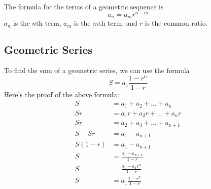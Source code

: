 \documentclass{article}
\begin{document}
\begin{multicols}{2}
        The formula for the terms of a geometric sequence is
        \[a_n = a_mr^{n - m}\] $a_n$ is the $n$th term, $a_m$ is the $m$th term,
        and $r$ is the common ratio.

        \subsection*{Geometric Series}
        To find the sum of a geometric series, we can use the formula
        \[S = a_1 \frac{1 - r^n}{1 - r}\] Here's the proof of the above formula:
        \begin{align*}
            S &= a_1 + a_2 + \dots + a_n \\
            Sr &= a_1 r + a_2 r + \dots + a_n r \\
            Sr &= a_2 + a_3 + \dots + a_{n + 1} \\
            S - Sr &= a_1 - a_{n + 1} \\
            S(1 - r) &= a_1 - a_{n + 1} \\
            S &= \frac{a_1 - a_{n + 1}}{1 - r} \\
            S &= \frac{a_1 - a_1 r^n}{1 - r} \\
            S &= a_1 \frac{1 - r^n}{1 - r}
        \end{align*}


\end{multicols}
\end{document}
